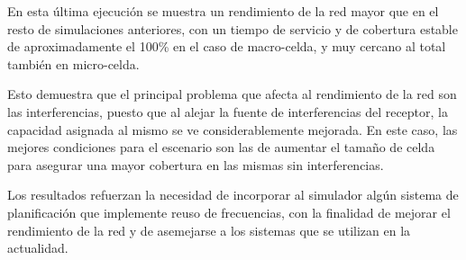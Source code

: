 En esta última ejecución se muestra un rendimiento de la red mayor que en el resto de simulaciones anteriores, con un tiempo de servicio y de cobertura estable de aproximadamente el 100\% en el caso de macro-celda, y muy cercano al total también en micro-celda.

Esto demuestra que el principal problema que afecta al rendimiento de la red son las interferencias, puesto que al alejar la fuente de interferencias del receptor, la capacidad asignada al mismo se ve considerablemente mejorada. En este caso, las mejores condiciones para el escenario son las de aumentar el tamaño de celda para asegurar una mayor cobertura en las mismas sin interferencias.

Los resultados refuerzan la necesidad de incorporar al simulador algún sistema de planificación que implemente reuso de frecuencias, con la finalidad de mejorar el rendimiento de la red y de asemejarse a los sistemas que se utilizan en la actualidad.